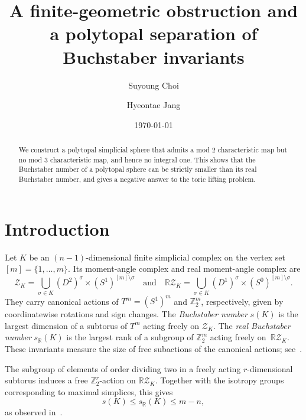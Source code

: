 \documentclass{amsart}
\author[S. Choi]{Suyoung Choi}
\author[H. Jang]{Hyeontae Jang}
\title[Separation of Buchstaber invariants]{A finite-geometric obstruction and a polytopal separation of Buchstaber invariants}
\date{\today}
\theoremstyle{plain}
\numberwithin{equation}{section}
\theoremstyle{remark}
\theoremstyle{definition}
\newcommand{\Z}{\mathbb Z}
\newcommand{\cZ}{\mathcal Z}
\newcommand{\RZ}{\mathbb R \mathcal Z}
\newcommand{\R}{\mathbb R}
\newcommand{\wideand}{\quad \text{and} \quad}
\begin{document}
\maketitle

\begin{abstract}
    We construct a polytopal simplicial sphere that admits a mod $2$ characteristic map but no mod $3$ characteristic map, and hence no integral one.
    This shows that the Buchstaber number of a polytopal sphere can be strictly smaller than its real Buchstaber number, and gives a negative answer to the toric lifting problem.
\end{abstract}


\section{Introduction}
Let $K$ be an $(n-1)$-dimensional finite simplicial complex on the vertex set~$[m]=\{1,\ldots,m\}$. 
Its moment-angle complex and real moment-angle complex are
$$
    \cZ_K=\bigcup_{\sigma\in K}(D^2)^\sigma\times(S^1)^{[m]\setminus\sigma} \wideand \RZ_K=\bigcup_{\sigma\in K}(D^1)^\sigma\times(S^0)^{[m]\setminus\sigma}.
$$
They carry canonical actions of $T^m=(S^1)^m$ and $\Z_2^m$, respectively, given by coordinatewise rotations and sign changes. 
The \emph{Buchstaber number} $s(K)$ is the largest dimension of a subtorus of $T^m$ acting freely on $\cZ_K$.
The \emph{real Buchstaber number} $s_{\R}(K)$ is the largest rank of a subgroup of $\Z_2^m$ acting freely on~$\RZ_K$. 
These invariants measure the size of free subactions of the canonical actions; see~\cite{Fukukawa-Masuda2011, Erokhovets2014, Buchstaber-Panov2015book}.

The subgroup of elements of order dividing two in a freely acting $r$-dimensional subtorus induces a free $\Z_2^r$-action on $\RZ_K$. 
Together with the isotropy groups corresponding to maximal simplices, this gives
$$
    s(K)\le s_{\R}(K)\le m-n,
$$
as observed in~\cite{Fukukawa-Masuda2011}.
\end{document}
